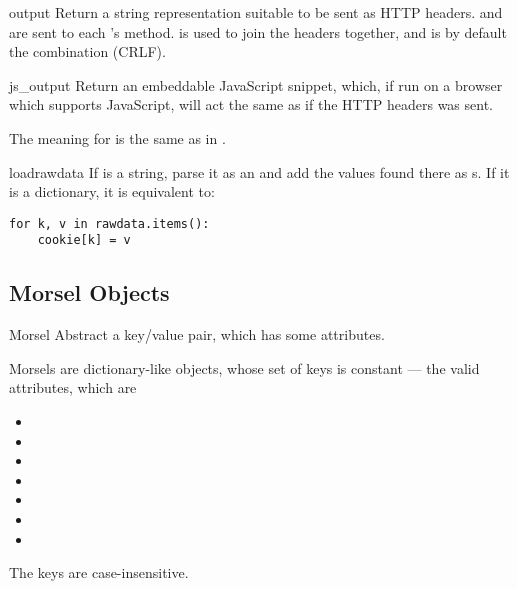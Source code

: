 \begin{methoddesc}[BaseCookie]{output}{}
Return a string representation suitable to be sent as HTTP headers.
 and  are sent to each 's
 method.  is used to join the headers
together, and is by default the combination  (CRLF).
\end{methoddesc}

\begin{methoddesc}[BaseCookie]{js_output}{}
Return an embeddable JavaScript snippet, which, if run on a browser which
supports JavaScript, will act the same as if the HTTP headers was sent.

The meaning for  is the same as in .
\end{methoddesc}

\begin{methoddesc}[BaseCookie]{load}{rawdata}
If  is a string, parse it as an  and add
the values found there as s. If it is a dictionary, it
is equivalent to:

\begin{verbatim}
for k, v in rawdata.items():
    cookie[k] = v
\end{verbatim}
\end{methoddesc}


\subsection{Morsel Objects \label{morsel-objects}}

\begin{classdesc}{Morsel}{}
Abstract a key/value pair, which has some  attributes.

Morsels are dictionary-like objects, whose set of keys is constant ---
the valid  attributes, which are

\begin{itemize}
\item {}
\item {}
\item {}
\item {}
\item {}
\item {}
\item {}
\end{itemize}

The keys are case-insensitive.
\end{classdesc}

